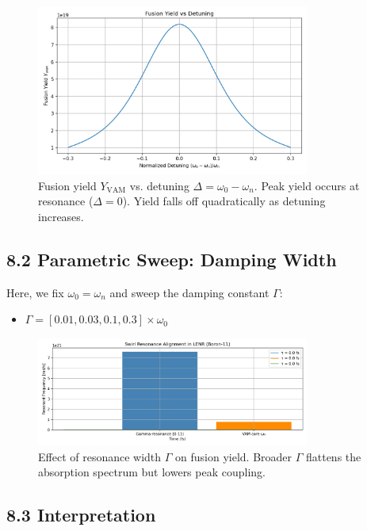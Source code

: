 \begin{figure}[h!]
  \centering
  \includegraphics[width=0.8\textwidth]{Appendix_BeamSwirlInteractionSpectrumImage6}
  \caption{Fusion yield $Y_{\mathrm{VAM}}$ vs. detuning $\Delta = \omega_0 - \omega_n$. Peak yield occurs at resonance (\(\Delta = 0\)). Yield falls off quadratically as detuning increases.}
\end{figure}

\subsection*{8.2 Parametric Sweep: Damping Width}

Here, we fix $\omega_0 = \omega_n$ and sweep the damping constant $\Gamma$:

\begin{itemize}
  \item $\Gamma = [0.01, 0.03, 0.1, 0.3] \times \omega_0$
\end{itemize}

\begin{figure}[h!]
  \centering
  \includegraphics[width=0.8\textwidth]{Appendix_BeamSwirlInteractionSpectrumImage5}
  \caption{Effect of resonance width $\Gamma$ on fusion yield. Broader $\Gamma$ flattens the absorption spectrum but lowers peak coupling.}
\end{figure}

\subsection*{8.3 Interpretation}

